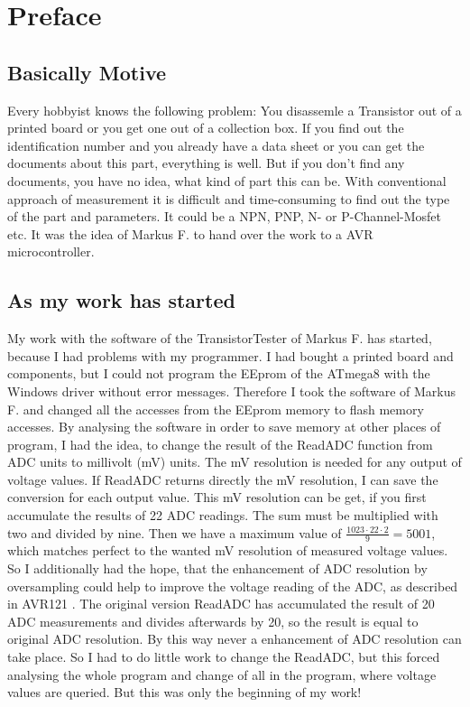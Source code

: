 \section*{Preface}
\subsection*{Basically Motive}
Every hobbyist knows the following problem: You disassemle a Transistor out of a printed board 
or you get one out of a collection box. 
If you find out the identification number and you already have a data sheet or you can get the documents about this part,
 everything is well.
But if you don't find any documents, you have no idea, what kind of part this can be.
With conventional approach of measurement it is difficult and time-consuming to find out the type of the part and parameters.
It could be a NPN, PNP, N- or P-Channel-Mosfet etc.
It was the idea of Markus F. to hand over the work to a AVR microcontroller.
\subsection*{As my work has started}
My work with the software of the TransistorTester of Markus F. \cite{Frejek} has started, because I had problems with 
my programmer. I had bought a printed board and components, but I could not program the EEprom of 
the ATmega8 with the Windows driver without error messages. Therefore I took the software of Markus F. and changed all the accesses
from the EEprom memory to flash memory accesses. By analysing the software in order to save memory
at other places of program, I had the idea, to change the result of the ReadADC function from ADC units
to millivolt (mV) units. The mV resolution is needed for any output of voltage values.
If ReadADC returns directly the mV resolution, I can save the conversion for each output value.
This mV resolution can be get, if you first accumulate the results of 22 ADC readings.
 The sum must be multiplied with two and divided by nine. Then we have a maximum value of \begin{math}\frac{1023\cdot22\cdot2}{9} = 5001\end{math},
which matches perfect to the wanted mV resolution of measured voltage values.
So I additionally had the hope, that the enhancement of ADC resolution by oversampling could help to improve the
voltage reading of the ADC, as described in AVR121 \cite{AVR121}.
The original version ReadADC has accumulated the result of 20 ADC measurements and divides afterwards by 20, 
so the result is equal to original ADC resolution. By this way never a enhancement of ADC resolution can take place.
So I had to do little work to change the ReadADC, but this forced analysing the whole program and change
of all  in the program, where voltage values are queried.
But this was only the beginning of my work!\\

